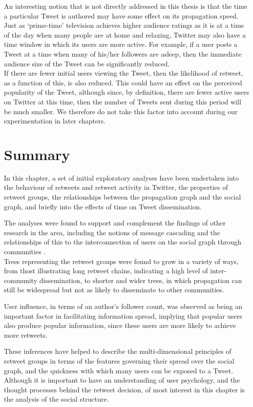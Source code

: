An interesting notion that is not directly addressed in this thesis is that the time a particular Tweet is authored may have some effect on its propagation speed. Just as `prime-time' television achieves higher audience ratings as it is at a time of the day when many people are at home and relaxing, Twitter may also have a time window in which its users are more active. For example, if a user posts a Tweet at a time when many of his/her followers are asleep, then the immediate audience size of the Tweet can be significantly reduced.\\
If there are fewer initial users viewing the Tweet, then the likelihood of retweet, as a function of this, is also reduced. This could have an effect on the perceived popularity of the Tweet, although since, by definition, there are fewer active users on Twitter at this time, then the number of Tweets sent during this period will be much smaller. We therefore do not take this factor into account during our experimentation in later chapters.


\section{Summary}
In this chapter, a set of initial exploratory analyses have been undertaken into the behaviour of retweets and retweet activity in Twitter, the properties of retweet groups, the relationships between the propagation graph and the social graph, and briefly into the effects of time on Tweet dissemination.

The analyses were found to support and complement the findings of other research in the area, including the notions of message cascading \cite{galuba10} and the relationships of this to the interconnection of users on the social graph through communities \cite{java07}.\\
Trees representing the retweet groups were found to grow in a variety of ways, from thost illustrating long retweet chains, indicating a high level of inter-community dissemination, to shorter and wider trees, in which propagation can still be widespread but not as likely to disseminate to other communities.

User influence, in terms of an author's follower count, was observed as being an important factor in facilitating information spread, implying that popular users also produce popular information, since these users are more likely to achieve more retweets.

These inferences have helped to describe the multi-dimensional principles of retweet groups in terms of the features governing their spread over the social graph, and the quickness with which many users can be exposed to a Tweet. Although it is important to have an understanding of user psychology, and the thought processes behind the retweet decision, of most interest in this chapter is the analysis of the social structure.


